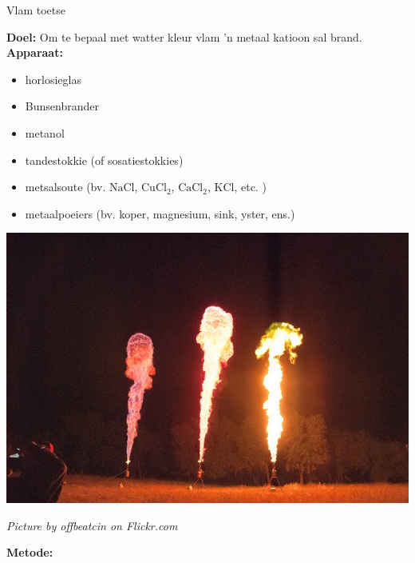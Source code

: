 \nopagebreak
\begin{i_experiment}{Vlam toetse}{
            \nopagebreak
            \label{m38741*eip-699}\noindent{}\textbf{Doel:}\newline
Om te bepaal met watter kleur vlam 'n metaal katioon sal brand. \\
\label{m38741*eip-6991}\noindent{}\textbf{Apparaat:}\newline
\begin{minipage}{.5\textwidth}
\begin{itemize}[noitemsep]
\item horlosieglas
\item Bunsenbrander
\item metanol
\item tandestokkie (of sosatiestokkies)
\item metsalsoute (bv. $\text{NaCl}$, ${\text{CuCl}}_{2}$, ${\text{CaCl}}_{2}$, $\text{KCl}$, etc. )
\item metaalpoeiers (bv. koper, magnesium, sink, yster, ens.)
\end{itemize}
\end{minipage}
\begin{minipage}{.5\textwidth}
\begin{center}
 \includegraphics[width=.8\textwidth]{photos/offbeatcin.jpg}\par
\textit{Picture by offbeatcin on Flickr.com}
\end{center}
\end{minipage}
\label{m38741*eip-6992}\noindent{}\textbf{Metode:}\newline
}
\end{i_experiment}
